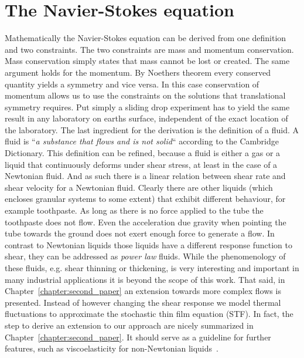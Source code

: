 \section{The Navier-Stokes equation}
\label{sec:navier_stokes_sec}
Mathematically the Navier-Stokes equation can be derived from one definition and two constraints.
The two constraints are mass and momentum conservation.
Mass conservation simply states that mass cannot be lost or created.
The same argument holds for the momentum.
By Noethers theorem every conserved quantity yields a symmetry and vice versa.
In this case conservation of momentum allows us to use the constraints on the solutions that translational symmetry requires.
Put simply a sliding drop experiment has to yield the same result in any laboratory on earths surface, independent of the exact location of the laboratory.
The last ingredient for the derivation is the definition of a fluid.
A fluid is ``\textit{a substance that flows and is not solid}`` according to the Cambridge Dictionary.
This definition can be refined, because a fluid is either a gas or a liquid that continuously deforms under shear stress, at least in the case of a Newtonian fluid.
And as such there is a linear relation between shear rate and shear velocity for a Newtonian fluid.
Clearly there are other liquids (which encloses granular systems to some extent) that exhibit different behaviour, for example toothpaste.
As long as there is no force applied to the tube the toothpaste does not flow.
Even the acceleration due gravity when pointing the tube towards the ground does not exert enough force to generate a flow.
In contrast to Newtonian liquids those liquids have a different response function to shear, they can be addressed as \textit{power law} fluids.
While the phenomenology of these fluids, e.g. shear thinning or thickening, is very interesting and important in many industrial applications it is beyond the scope of this work. 
That said, in Chapter~\ref{chapter:second_paper} an extension towards more complex flows is presented. 
Instead of however changing the shear response we model thermal fluctuations to approximate the stochastic thin film equation (STF).
In fact, the step to derive an extension to our approach are nicely summarized in Chapter~\ref{chapter:second_paper}. 
It should serve as a guideline for further features, such as viscoelasticity for non-Newtonian liquids~\cite{bouchutNewModelShallow2013}. 


